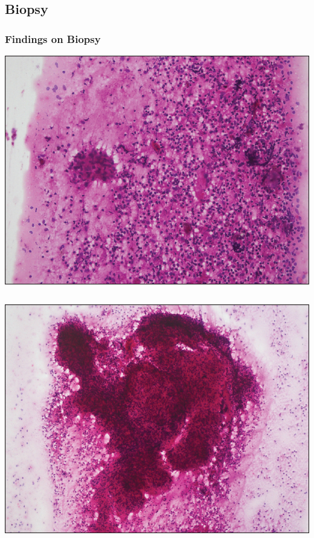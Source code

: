 \documentclass{beamer}
\begin{document}
\subsection{Biopsy}
	\begin{frame}
		\frametitle{Findings on Biopsy}
		\centering
			\includegraphics[height=0.40\textheight,keepaspectratio]{nerve-biopsy-hansens.jpg}
			\begin{columns}
				\centering
				\includegraphics[height=.4\textheight,keepaspectratio]{nerve-aspirate-hansens.jpg}
				\centering

\end{columns}
\end{frame}
\end{document}
